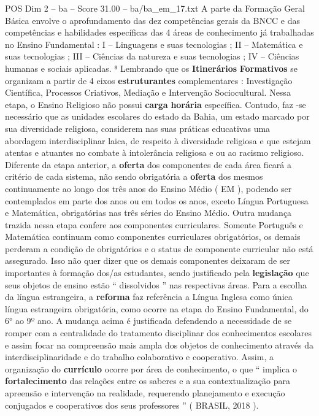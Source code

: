 \begin{textsample}{POS Dim 2 – ba – Score 31.00 – ba/ba\_em\_17.txt}
A parte da Formação Geral Básica envolve o aprofundamento das dez competências gerais da BNCC e das competências e habilidades específicas das 4 áreas de conhecimento já trabalhadas no Ensino Fundamental : I – Linguagens e suas tecnologias ; II – Matemática e suas tecnologias ; III – Ciências da natureza e suas tecnologias ; IV – Ciências humanas e sociais aplicadas. ⁸ Lembrando que os \textbf{Itinerários} \textbf{Formativos} se organizam a partir de 4 eixos \textbf{estruturantes} complementares : Investigação Científica, Processos Criativos, Mediação e Intervenção Sociocultural.
Nessa etapa, o Ensino Religioso não possui \textbf{carga} \textbf{horária} específica.
Contudo, faz -se necessário que as unidades escolares do estado da Bahia, um estado marcado por sua diversidade religiosa, considerem nas suas práticas educativas uma abordagem interdisciplinar laica, de respeito à diversidade religiosa e que estejam atentas e atuantes no combate à intolerância religiosa e ou ao racismo religioso.
Diferente da etapa anterior, a \textbf{oferta} dos componentes de cada área ficará a critério de cada sistema, não sendo obrigatória a \textbf{oferta} dos mesmos continuamente ao longo dos três anos do Ensino Médio ( EM ), podendo ser contemplados em parte dos anos ou em todos os anos, exceto Língua Portuguesa e Matemática, obrigatórias nas três séries do Ensino Médio.
Outra mudança trazida nessa etapa confere aos componentes curriculares.
Somente Português e Matemática continuam como componentes curriculares obrigatórios, os demais perderam a condição de obrigatórios e o status de componente curricular não está assegurado.
Isso não quer dizer que os demais componentes deixaram de ser importantes à formação dos/as estudantes, sendo justificado pela \textbf{legislação} que seus objetos de ensino estão “ dissolvidos ” nas respectivas áreas.
Para a escolha da língua estrangeira, a \textbf{reforma} faz referência a Língua Inglesa como única língua estrangeira obrigatória, como ocorre na etapa do Ensino Fundamental, do 6{\EmojiFont °} ao 9º ano.
A mudança acima é justificada defendendo a necessidade de se romper com a centralidade do tratamento disciplinar dos conhecimentos escolares e assim focar na compreensão mais ampla dos objetos de conhecimento através da interdisciplinaridade e do trabalho colaborativo e cooperativo.
Assim, a organização do \textbf{currículo} ocorre por área de conhecimento, o que “ implica o \textbf{fortalecimento} das relações entre os saberes e a sua contextualização para apreensão e intervenção na realidade, requerendo planejamento e execução conjugados e cooperativos dos seus professores ” ( BRASIL, 2018 ).

\end{textsample}
